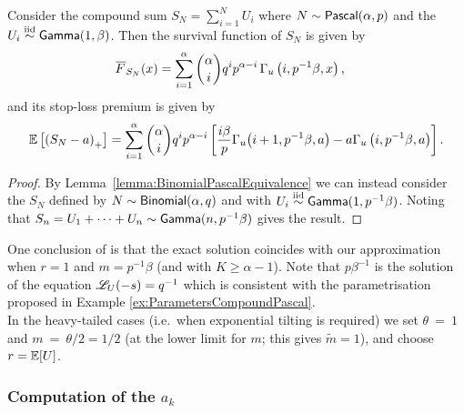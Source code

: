 \begin{corollary} \label{Coro:PascalExponentialStopLoss}
Consider the compound sum $S_N = \sum_{i=1}^N U_i$ where $N \sim \mathsf{Pascal}(\alpha,p)$ and the $U_i \overset{\smash{\mathrm{iid}}}{\sim}\mathsf{Gamma}(1,\beta)$.
Then the survival function of $S_N$ is given by
\begin{align*}
\Ftail_{S_N}(x) &= \sum_{i=1}^\alpha \binom{\alpha}{i} q^i p^{\alpha-i} \, \Gamma_u\left(i, p^{-1}\beta, x\right),
\end{align*}
and its stop-loss premium is given by
\begin{equation*}\label{eq:StopLossCompoundNegBinExp}
\operatorname{{\mathbb E}}\left[\left(S_N-a\right)_{+}\right] = \sum_{i=1}^\alpha \binom{\alpha}{i} q^i p^{\alpha-i} \left[ \frac{i\beta}{p } \Gamma_u\big(i+1, p^{-1} \beta , a \big) - a \Gamma_u\left(i, p^{-1}\beta , a\right) \right].
\end{equation*}
\end{corollary}
\begin{proof}
By Lemma~\ref{lemma:BinomialPascalEquivalence} we can instead consider the $S_N$ defined by $N \sim \mathsf{Binomial}(\alpha,q)$ and with $U_i \overset{\smash{\mathrm{iid}}}{\sim} \mathsf{Gamma}(1,p^{-1} \beta)$.
Noting that $S_n = U_1 + \dots + U_n \sim \mathsf{Gamma}(n, p^{-1} \beta)$ gives the result.
\end{proof}
One conclusion of  is that the exact solution coincides with our approximation when $r=1$ and $m=p^{-1}\beta$ (and with $K \ge \alpha - 1$). Note that $p\beta^{-1}$ is the solution of the equation $\mathscr{L}_{U}(-s)=q^{-1}$ which is consistent with the parametrisation proposed in Example \ref{ex:ParametersCompoundPascal}.\\

In the heavy-tailed cases (i.e.\ when exponential tilting is required) we set $\theta~=~1$ and $m~=~\theta/2 = 1/2$ (at the lower limit for $m$; this gives $\widetilde{m}=1$), and choose $r = \operatorname{{\mathbb E}}[U]$.

\subsubsection{Computation of the $a_k$} \label{sssec:ComputingOrthogonalCoefficients}

